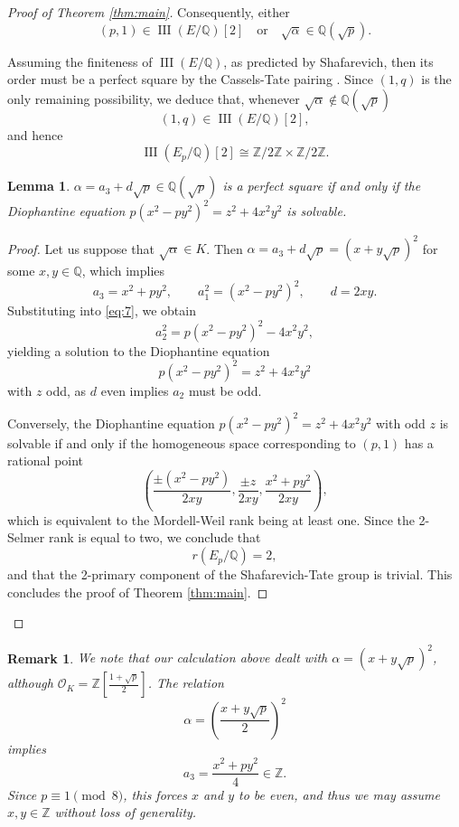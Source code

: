 \documentclass[10pt]{article}
\DeclareMathOperator{\III}{III}
\newtheorem{lemma}[theorem]{Lemma}
\newtheorem{remark}[theorem]{Remark}
\begin{document}
\begin{proof}[Proof of Theorem \ref{thm:main}]
Consequently, either
\[(p,1) \in \III(E/\mathbb{Q})[2] \quad \text{or} \quad \sqrt{\alpha} \in \mathbb{Q}(\sqrt{p}).\]

Assuming the finiteness of \(\III(E/\mathbb{Q})\), as predicted by Shafarevich, then its order must be a perfect square by the Cassels-Tate pairing \cite{5}. Since \((1,q)\) is the only remaining possibility, we deduce that, whenever \(\sqrt{\alpha} \notin \mathbb{Q}(\sqrt{p})\)
\[(1,q) \in \III(E/\mathbb{Q})[2],\]
and hence
\[\III(E_{p}/\mathbb{Q})[2] \cong \mathbb{Z}/2\mathbb{Z} \times \mathbb{Z}/2\mathbb{Z}.\]

\begin{lemma}\label{lem:diophantine}
\(\alpha = a_{3} + d\sqrt{p} \in \mathbb{Q}(\sqrt{p})\) is a perfect square if and only if the Diophantine equation \(p(x^{2} - py^{2})^{2} = z^{2} + 4x^{2}y^{2}\) is solvable.
\end{lemma}

\begin{proof}
Let us suppose that \(\sqrt{\alpha} \in K\). Then \(\alpha = a_{3} + d\sqrt{p} = (x + y\sqrt{p})^{2}\) for some \(x, y \in \mathbb{Q}\), which implies
\[a_{3} = x^{2} + py^{2}, \qquad a_{1}^{2} = (x^{2} - py^{2})^{2}, \qquad d = 2xy.\]
Substituting into \eqref{eq:7}, we obtain
\[a_{2}^{2} = p(x^{2} - py^{2})^{2} - 4x^{2}y^{2},\]
yielding a solution to the Diophantine equation
\[p(x^{2} - py^{2})^{2} = z^{2} + 4x^{2}y^{2}\]
with \(z\) odd, as \(d\) even implies \(a_{2}\) must be odd.

Conversely, the Diophantine equation \(p(x^{2} - py^{2})^{2} = z^{2} + 4x^{2}y^{2}\) with odd \(z\) is solvable if and only if the homogeneous space corresponding to \((p,1)\) has a rational point
\[\left(\frac{\pm(x^{2} - py^{2})}{2xy}, \frac{\pm z}{2xy}, \frac{x^{2} + py^{2}}{2xy}\right),\]
which is equivalent to the Mordell-Weil rank being at least one. Since the 2-Selmer rank is equal to two, we conclude that
\[r(E_{p}/\mathbb{Q}) = 2,\]
and that the 2-primary component of the Shafarevich-Tate group is trivial. This concludes the proof of Theorem \ref{thm:main}.
\end{proof}
\end{proof}

\begin{remark}\label{rem:integrality}
We note that our calculation above dealt with \(\alpha = (x + y\sqrt{p})^{2}\), although \(\mathcal{O}_{K} = \mathbb{Z}\left[\frac{1+\sqrt{p}}{2}\right]\). The relation
\[\alpha = \left(\frac{x + y\sqrt{p}}{2}\right)^{2}\]
implies
\[a_{3} = \frac{x^{2} + py^{2}}{4} \in \mathbb{Z}.\]
Since \(p \equiv 1 \pmod{8}\), this forces \(x\) and \(y\) to be even, and thus we may assume \(x, y \in \mathbb{Z}\) without loss of generality.
\end{remark}
\end{document}
